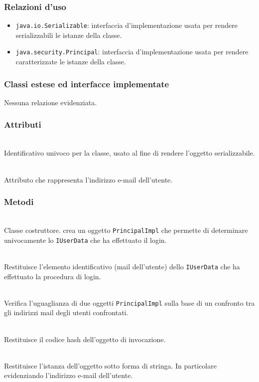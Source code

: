 \subsubsection*{Relazioni d'uso}
\begin{itemize}
	\item \texttt{java.io.Serializable}: interfaccia d'implementazione usata per rendere serializzabili le istanze della classe.
	\item \texttt{java.security.Principal}: interfaccia d'implementazione usata per rendere caratterizzate le istanze della classe.
\end{itemize}

\subsubsection*{Classi estese ed interfacce implementate}

Nessuna relazione evidenziata.

\subsubsection*{Attributi}
\begin{description}
  \item{}\\
  Identificativo univoco per la classe, usato al fine di rendere l'oggetto serializzabile.
  \item{}\\
  Attributo che rappresenta l'indirizzo e-mail dell'utente.
\end{description}

\subsubsection*{Metodi}
\begin{description}
	\item{}\\
	Classe costruttore. crea un oggetto \texttt{PrincipalImpl} che permette di determinare univocamente lo \texttt{IUserData} che ha effettuato il login.
	\item{}\\
	Restituisce l'elemento identificativo (mail dell'utente) dello \texttt{IUserData} che ha effettuato la procedura di login.
	\item{}\\
	Verifica l'uguaglianza di due oggetti \texttt{PrincipalImpl} sulla base di un confronto tra gli indirizzi mail degli utenti confrontati.
	\item{}\\
	Restituisce il codice hash dell'oggetto di invocazione.				\item{}\\
	Restituisce l'istanza dell'oggetto sotto forma di stringa. In particolare evidenziando l'indirizzo e-mail dell'utente.
\end{description}

